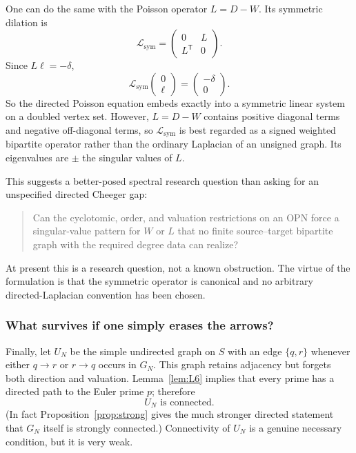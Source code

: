 \documentclass[11pt]{article}
\theoremstyle{definition}
\theoremstyle{remark}
\begin{document}
One can do the same with the Poisson operator $L=D-W$.  Its symmetric
dilation is
\[
\boxed{
\mathcal L_{\mathrm{sym}}=
\begin{pmatrix}
0&L\\
L^{\mathsf T}&0
\end{pmatrix}.
}
\]
Since $L\ell=-\delta$,
\[
\mathcal L_{\mathrm{sym}}
\begin{pmatrix}0\\ \ell\end{pmatrix}
=
\begin{pmatrix}-\delta\\0\end{pmatrix}.
\]
So the directed Poisson equation embeds exactly into a symmetric linear system
on a doubled vertex set.  However, $L=D-W$ contains positive diagonal terms
and negative off-diagonal terms, so $\mathcal L_{\mathrm{sym}}$ is best regarded as a signed
weighted bipartite operator rather than the ordinary Laplacian of an unsigned
graph.  Its eigenvalues are $\pm$ the singular values of $L$.

This suggests a better-posed spectral research question than asking for an
unspecified directed Cheeger gap:

\begin{quote}
Can the cyclotomic, order, and valuation restrictions on an OPN force a
singular-value pattern for $W$ or $L$ that no finite source--target bipartite
graph with the required degree data can realize?
\end{quote}

At present this is a research question, not a known obstruction.  The virtue
of the formulation is that the symmetric operator is canonical and no
arbitrary directed-Laplacian convention has been chosen.

\subsubsection{What survives if one simply erases the arrows?}

Finally, let $U_N$ be the simple undirected graph on $S$ with an edge
$\{q,r\}$ whenever either $q\to r$ or $r\to q$ occurs in $G_N$.  This graph
retains adjacency but forgets both direction and valuation.
Lemma~\ref{lem:L6} implies that every prime has a directed path to the Euler
prime $p$; therefore
\[
\boxed{U_N\text{ is connected}.}
\]
(In fact Proposition~\ref{prop:strong} gives the much stronger directed
statement that $G_N$ itself is strongly connected.)  Connectivity of $U_N$
is a genuine necessary condition, but it is very weak.
\end{document}
